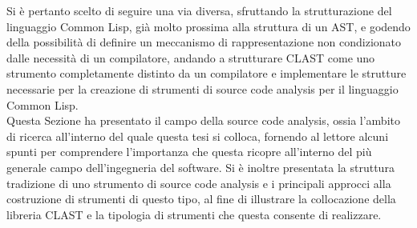 Si è pertanto scelto di seguire una via diversa, sfruttando la strutturazione
del linguaggio Common Lisp, già molto prossima alla struttura di un AST, e
godendo della possibilità di definire un meccanismo di rappresentazione non
condizionato dalle necessità di un compilatore, andando a strutturare CLAST
come uno strumento completamente distinto da un compilatore e implementare le
strutture necessarie per la creazione di strumenti di source code analysis per
il linguaggio Common Lisp.\\

Questa Sezione ha presentato il campo della source code analysis, ossia
l'ambito di ricerca all'interno del quale questa tesi si colloca, fornendo al
lettore alcuni spunti per comprendere l'importanza che questa ricopre
all'interno del più generale campo dell'ingegneria del software. Si è inoltre
presentata la struttura tradizione di uno strumento di source code analysis e i
principali approcci alla costruzione di strumenti di questo tipo, al fine di
illustrare la collocazione della libreria CLAST e la tipologia di strumenti che
questa consente di realizzare.






